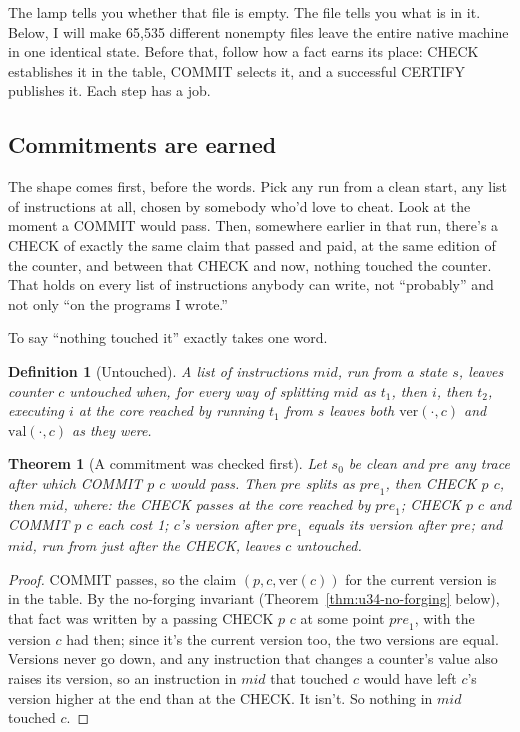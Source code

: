 \documentclass[11pt,twoside]{article}
\theoremstyle{thielethm}
\newtheorem{theorem}{Theorem}[section]
\theoremstyle{thieledef}
\newtheorem{definition}{Definition}[section]
\theoremstyle{thieledef}
\theoremstyle{thieledef}
\theoremstyle{thielethm}
\theoremstyle{thieleobs}
\theoremstyle{thielethm}
\begin{document}
The lamp tells you whether that file is empty. The file tells you what is in it.
Below, I will make 65,535 different nonempty files leave the entire native machine in
one identical state. Before that, follow how a fact earns its place: CHECK establishes
it in the table, COMMIT selects it, and a successful CERTIFY publishes it. Each step
has a job.

\subsection{Commitments are earned}

The shape comes first, before the words. Pick any run from a clean start, any list of instructions
at all, chosen by somebody who'd love to cheat. Look at the moment a COMMIT would pass.
Then, somewhere earlier in that run, there's a CHECK of exactly the same claim that passed
and paid, at the same edition of the counter, and between that CHECK and now, nothing
touched the counter. That holds on every list of instructions anybody can write, not
``probably'' and not only ``on the programs I wrote.''

To say ``nothing touched it'' exactly takes one word.

\begin{definition}[Untouched]\label{def:u34-untouched}
A list of instructions $\mathit{mid}$, run from a state $s$, leaves counter $c$
\emph{untouched} when, for every way of splitting $\mathit{mid}$ as $t_1$, then $i$, then
$t_2$, executing $i$ at the core reached by running $t_1$ from $s$ leaves both
$\mathrm{ver}(\cdot, c)$ and $\mathrm{val}(\cdot, c)$ as they were.
\end{definition}

\begin{theorem}[A commitment was checked first]\label{thm:u34-commit-earned}
Let $s_0$ be clean and $\mathit{pre}$ any trace after which COMMIT $p$ $c$ would pass. Then
$\mathit{pre}$ splits as $\mathit{pre}_1$, then CHECK $p$ $c$, then $\mathit{mid}$, where:
the CHECK passes at the core reached by $\mathit{pre}_1$; CHECK $p$ $c$ and COMMIT $p$ $c$ each cost 1; $c$'s version after $\mathit{pre}_1$ equals its version after
$\mathit{pre}$; and $\mathit{mid}$, run from just after the CHECK, leaves $c$ untouched.
\end{theorem}

\begin{proof}
COMMIT passes, so the claim $(p, c, \mathrm{ver}(c))$ for the current version is in the
table. By the no-forging invariant (Theorem~\ref{thm:u34-no-forging} below), that fact was
written by a passing CHECK $p$ $c$ at some point $\mathit{pre}_1$, with the version $c$ had
then; since it's the current version too, the two versions are equal. Versions never go
down, and any instruction that changes a counter's value also raises its version, so an
instruction in $\mathit{mid}$ that touched $c$ would have left $c$'s version higher at the
end than at the CHECK. It isn't. So nothing in $\mathit{mid}$ touched $c$.
\end{proof}
\end{document}

